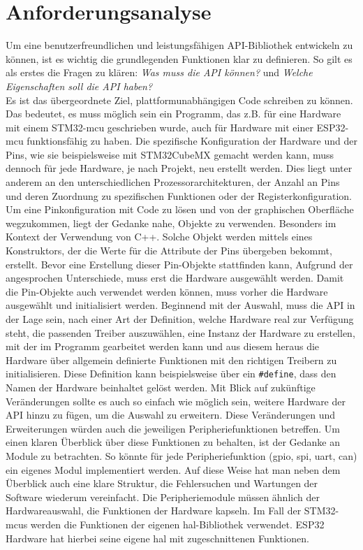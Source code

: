 \section{Anforderungsanalyse}
Um eine benutzerfreundlichen und leistungsfähigen API-Bibliothek entwickeln zu können, ist es wichtig die grundlegenden Funktionen klar zu definieren.
So gilt es als erstes die Fragen zu klären: \emph{Was muss die API können?} und \emph{Welche Eigenschaften soll die API haben?}\\
Es ist das übergeordnete Ziel, plattformunabhängigen Code schreiben zu können.
Das bedeutet, es muss möglich sein ein Programm, das z.B. für eine Hardware mit einem STM32-\gls{mcu} geschrieben wurde, auch für Hardware mit einer ESP32-\gls{mcu} funktionsfähig zu haben.
Die spezifische Konfiguration der Hardware und der Pins, wie sie beispielsweise mit STM32CubeMX gemacht werden kann, muss dennoch für jede Hardware, je nach Projekt, neu erstellt werden.
Dies liegt unter anderem an den unterschiedlichen Prozessorarchitekturen, der Anzahl an Pins und deren Zuordnung zu spezifischen Funktionen oder der Registerkonfiguration.
Um eine Pinkonfiguration mit Code zu lösen und von der graphischen Oberfläche wegzukommen, liegt der Gedanke nahe, Objekte zu verwenden.
Besonders im Kontext der Verwendung von C++.
Solche Objekt werden mittels eines Konstruktors, der die Werte für die Attribute der Pins übergeben bekommt, erstellt.
Bevor eine Erstellung dieser Pin-Objekte stattfinden kann, Aufgrund der angesprochen Unterschiede, muss erst die Hardware ausgewählt werden.
Damit die Pin-Objekte auch verwendet werden können, muss vorher die Hardware ausgewählt und initialisiert werden.
Beginnend mit der Auswahl, muss die API in der Lage sein, nach einer Art der Definition, welche Hardware real zur Verfügung steht, die passenden Treiber auszuwählen, eine Instanz der Hardware zu erstellen, mit der im Programm gearbeitet werden kann und aus diesem heraus die Hardware über allgemein definierte Funktionen mit den richtigen Treibern zu initialisieren.
Diese Definition kann beispielsweise über ein \texttt{\#define}, dass den Namen der Hardware beinhaltet gelöst werden.
Mit Blick auf zukünftige Veränderungen sollte es auch so einfach wie möglich sein, weitere Hardware der API hinzu zu fügen, um die Auswahl zu erweitern.
Diese Veränderungen und Erweiterungen würden auch die jeweiligen Peripheriefunktionen betreffen.
Um einen klaren Überblick über diese Funktionen zu behalten, ist der Gedanke an Module zu betrachten.
So könnte für jede Peripheriefunktion (\gls{gpio}, \gls{spi}, \gls{uart}, \gls{can}) ein eigenes Modul implementiert werden.
Auf diese Weise hat man neben dem Überblick auch eine klare Struktur, die Fehlersuchen und Wartungen der Software wiederum vereinfacht.
Die Peripheriemodule müssen ähnlich der Hardwareauswahl, die Funktionen der Hardware kapseln.
Im Fall der STM32-\gls{mcu}s werden die Funktionen der eigenen \gls{hal}-Bibliothek verwendet.
ESP32 Hardware hat hierbei seine eigene \gls{hal} mit zugeschnittenen Funktionen.

